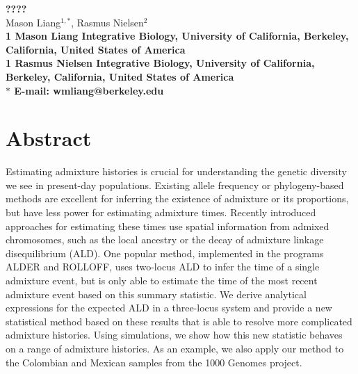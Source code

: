 \documentclass[10pt]{article}
\date{}
\begin{document}
\begin{flushleft}
	{\Large \textbf{????} } \\

 	Mason Liang$^{1,\ast}$,
	Rasmus Nielsen$^{2}$\\

	\bf{1} Mason Liang Integrative Biology, University of California, Berkeley, California, United States of America\\
	\bf{1} Rasmus Nielsen Integrative Biology, University of California, Berkeley, California, United States of America\\
	$\ast$ E-mail: wmliang@berkeley.edu
\end{flushleft}

\section*{Abstract}
Estimating admixture histories is crucial for understanding the genetic
diversity we see in present-day populations. Existing allele frequency or
phylogeny-based methods are excellent for inferring the existence of admixture
or its proportions, but have less power for estimating admixture times. Recently
introduced approaches for estimating these times use spatial information from
admixed chromosomes, such as the local ancestry or the decay of admixture
linkage disequilibrium (ALD).  One popular method, implemented in the programs
ALDER and ROLLOFF, uses two-locus ALD to infer the time of a single admixture
event, but is only able to estimate the time of the most recent admixture event
based on this summary statistic.  We derive analytical expressions for the
expected ALD in a three-locus system and provide a new statistical method based
on these results that is able to resolve more complicated admixture histories.
Using simulations, we show how this new statistic behaves on a range of
admixture histories. As an example, we also apply our method to the Colombian
and Mexican samples from the 1000 Genomes project.
\end{document}
